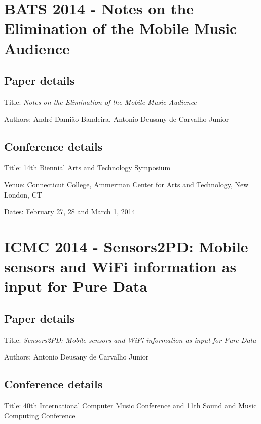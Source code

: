 \section{BATS 2014 - Notes on the Elimination of the Mobile Music Audience}
\label{ape:paperbats2014}

\subsection*{Paper details}

Title: \textit{Notes on the Elimination of the Mobile Music Audience}

Authors: André Damião Bandeira, Antonio Deusany de Carvalho Junior

\subsection*{Conference details}

Title: 14th Biennial Arts and Technology Symposium

Venue: Connecticut College, Ammerman Center for Arts and Technology, New London, CT

Dates: February 27, 28 and March 1, 2014





\section{ICMC 2014 - Sensors2PD: Mobile sensors and WiFi information as input for Pure Data}
\label{ape:papericmc2014}

\subsection*{Paper details}

Title: \textit{Sensors2PD: Mobile sensors and WiFi information as input for Pure Data}

Authors: Antonio Deusany de Carvalho Junior

\subsection*{Conference details}

Title: 40th International Computer Music Conference and 11th Sound and Music Computing Conference

